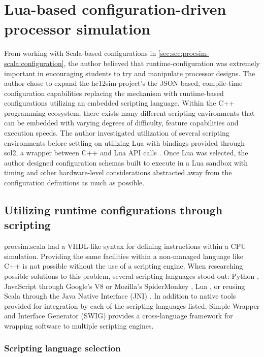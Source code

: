 \chapter{Lua-based configuration-driven processor simulation}
\label{ch:lua-config}

\newcommand{\luainline}[1]{\texttt{#1}}

 From working with Scala-based configurations in \cref{sec:sec:procsim-scala:configuration}, the author believed that runtime-configuration was extremely important in encouraging students to try and manipulate processor designs. The author chose to expand the hc12sim project's the JSON-based, compile-time configuration capabilities replacing the mechanism with runtime-based configurations utilizing an embedded scripting language. Within the C++ programming ecosystem, there exists many different scripting environments that can be embedded with varying degrees of difficulty, feature capabilities and execution speeds. The author investigated utilization of several scripting environments before settling on utilizing Lua \cite{Lua:Homepage} with bindings provided through sol2, a wrapper between C++ and Lua API calls \cite{Github:ThePhD:sol2}. Once Lua was selected, the author designed configuration schemas built to execute in a Lua sandbox with timing and other hardware-level considerations abstracted away from the configuration definitions as much as possible.

\section{Utilizing runtime configurations through scripting}

procsim.scala had a VHDL-like syntax for defining instructions within a CPU simulation. Providing the same facilities within a non-managed language like C++ is not possible without the use of a scripting engine. When researching possible solutions to this problem, several scripting languages stood out: Python \cite{Python:Homepage}, JavaScript through Google's V8 \cite{Google:V8} or Mozilla's SpiderMonkey \cite{MDN:SpiderMonkey}, Lua \cite{Lua:Homepage}, or reusing Scala through the Java Native Interface (JNI) \cite{Oracle:JNI}. In addition to native tools provided for integration by each of the scripting languages listed, Simple Wrapper and Interface Generator (SWIG) \cite{SWIG:Homepage} provides a cross-language framework for wrapping software to multiple scripting engines. 


\subsection{Scripting language selection}

